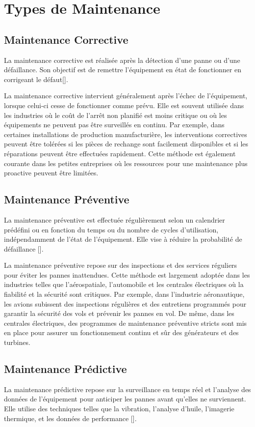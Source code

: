 \section{Types de Maintenance}

\subsection{Maintenance Corrective}
La maintenance corrective est réalisée après la détection d’une panne ou d’une
défaillance. Son objectif est de remettre l’équipement en état de fonctionner
en corrigeant le défaut[\cite{Sezdi2019}].

La maintenance corrective intervient généralement après l'échec de
l'équipement, lorsque celui-ci cesse de fonctionner comme prévu. Elle est
souvent utilisée dans les industries où le coût de l'arrêt non planifié est
moins critique ou où les équipements ne peuvent pas être surveillés en continu.
Par exemple, dans certaines installations de production manufacturière, les
interventions correctives peuvent être tolérées si les pièces de rechange sont
facilement disponibles et si les réparations peuvent être effectuées
rapidement. Cette méthode est également courante dans les petites entreprises
où les ressources pour une maintenance plus proactive peuvent être limitées.

\subsection{Maintenance Préventive}
La maintenance préventive est effectuée régulièrement selon un calendrier
prédéfini ou en fonction du temps ou du nombre de cycles d’utilisation,
indépendamment de l’état de l’équipement. Elle vise à réduire la probabilité de
défaillance [\cite{Sezdi2019}].

La maintenance préventive repose sur des inspections et des services réguliers
pour éviter les pannes inattendues. Cette méthode est largement adoptée dans
les industries telles que l'aérospatiale, l'automobile et les centrales
électriques où la fiabilité et la sécurité sont critiques. Par exemple, dans
l'industrie aéronautique, les avions subissent des inspections régulières et
des entretiens programmés pour garantir la sécurité des vols et prévenir les
pannes en vol. De même, dans les centrales électriques, des programmes de
maintenance préventive stricts sont mis en place pour assurer un fonctionnement
continu et sûr des générateurs et des turbines.

\subsection{Maintenance Prédictive}
La maintenance prédictive repose sur la surveillance en temps réel et l’analyse
des données de l’équipement pour anticiper les pannes avant qu’elles ne
surviennent. Elle utilise des techniques telles que la vibration, l’analyse
d’huile, l’imagerie thermique, et les données de performance​
[\cite{Bentivogli2023, Sangeetha2017}].

